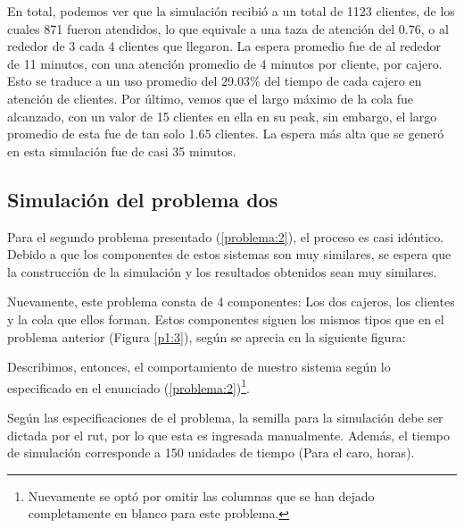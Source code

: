 En total, podemos ver que la simulación recibió a un total de 1123 clientes, de los cuales 871 fueron atendidos, lo que equivale a una taza de atención del $0.76$, o al rededor de 3 cada 4 clientes que llegaron. La espera promedio fue de al rededor de 11 minutos, con una atención promedio de 4 minutos por cliente, por cajero. Esto se traduce a un uso promedio del 29.03\% del tiempo de cada cajero en atención de clientes. Por último, vemos que el largo máximo de la cola fue alcanzado, con un valor de 15 clientes en ella en su peak, sin embargo, el largo promedio de esta fue de tan solo 1.65 clientes. La espera más alta que se generó en esta simulación fue de casi 35 minutos.

\clearpage
\subsection{Simulación del problema dos}
Para el segundo problema presentado (\ref{problema:2}), el proceso es casi idéntico. Debido a que los componentes de estos sistemas son muy similares, se espera que la construcción de la simulación y los resultados obtenidos sean muy similares.

Nuevamente, este problema consta de 4 componentes: Los dos cajeros, los clientes y la cola que ellos forman. Estos componentes siguen los mismos tipos que en el problema anterior (Figura \ref{p1:3}), según se aprecia en la siguiente figura:

Describimos, entonces, el comportamiento de nuestro sistema según lo especificado en el enunciado (\ref{problema:2})\footnote{Nuevamente se optó por omitir las columnas que se han dejado completamente en blanco para este problema.}.

\clearpage
Según las especificaciones de el problema, la semilla para la simulación debe ser dictada por el rut, por lo que esta es ingresada manualmente. Además, el tiempo de simulación corresponde a 150 unidades de tiempo (Para el caro, horas).

